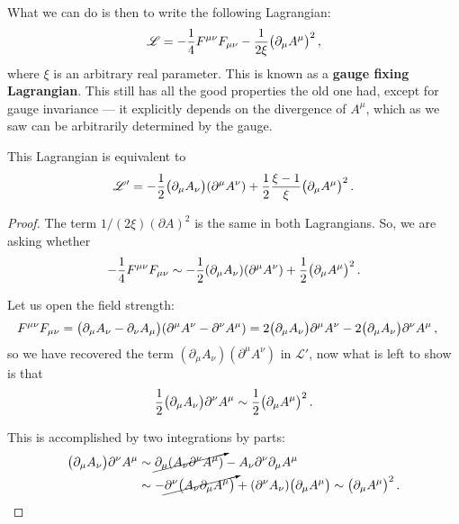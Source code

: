 \documentclass[main.tex]{subfiles}
\begin{document}
What we can do is then to write the following Lagrangian: 
%
\begin{align}
\mathscr{L} = - \frac{1}{4} F^{\mu \nu } F_{\mu \nu } - \frac{1}{2 \xi } 
\qty(\partial_{\mu } A^{\mu })^2
\,,
\end{align}
%
where \(\xi \) is an arbitrary real parameter. This is known as a \textbf{gauge fixing Lagrangian}. This still has all the good properties the old one had, except for gauge invariance --- it explicitly depends on the divergence of \(A^{\mu }\), which as we saw can be arbitrarily determined by the gauge. 

\begin{claim}
This Lagrangian is equivalent to 
%
\begin{align}
\mathscr{L}' = - \frac{1}{2} \qty(\partial_{\mu } A_{\nu })\qty(\partial^{\mu }A^{\nu }) + \frac{1}{2} \frac{\xi-1}{\xi } \qty(\partial_{\mu } A^{\mu })^2
\,.
\end{align}
\end{claim}

\begin{proof}
The term \(1/(2\xi) (\partial A)^2 \) is the same in both Lagrangians. So, we are asking whether 
%
\begin{align}
- \frac{1}{4} F^{\mu \nu} F_{\mu \nu } \sim -\frac{1}{2} (\partial_{\mu } A_{\nu }) \qty(\partial^{\mu } A^{\nu }) + \frac{1}{2} \qty(\partial_{\mu } A^{\mu })^2
\,.
\end{align}

Let us open the field strength: 
%
\begin{align}
F^{\mu \nu } F_{\mu \nu } =
\qty(\partial_{\mu } A_{\nu } - \partial_{\nu } A_{\mu })
\qty(\partial^{\mu } A^{\nu } - \partial^{\nu } A^{\mu })
&= 2 \qty(\partial_{\mu } A_{\nu }) \partial^{\mu} A^{\nu }
- 2 \qty(\partial_{\mu } A_{\nu }) \partial^{\nu }A^{\mu }  
\,,
\end{align}
%
so we have recovered the term \((\partial_{\mu } A_{\nu })(\partial^{\mu } A^{\nu })\) in \(\mathscr{L}'\), now what is left to show is that 
%
\begin{align}
\frac{1}{2} \qty(\partial_{\mu } A_{\nu }) \partial^{\nu }A^{\mu }  
\sim \frac{1}{2} \qty(\partial_{\mu } A^{\mu })^2
\,.
\end{align}

This is accomplished by two integrations by parts: 
%
\begin{subequations}
\begin{align}
\qty(\partial_{\mu } A_{\nu }) \partial^{\nu }A^{\mu }
&\sim \cancelto{}{\partial_{\mu } \qty(A_{\nu } \partial^{\nu } A^{\mu })}
- A_{\nu} \partial^{\nu }\partial_{\mu } A^{\mu }   \\
&\sim
-\cancelto{}{\partial^{\nu } \qty(A_{\nu } \partial_{\mu }A^{\mu })}
+ \qty(\partial^{\nu } A_{\nu }) \qty(\partial_{\mu }A^{\mu })
\sim
 \qty(\partial_{\mu }A^{\mu })^2
\,.
\end{align}
\end{subequations}
\end{proof}
\end{document}
